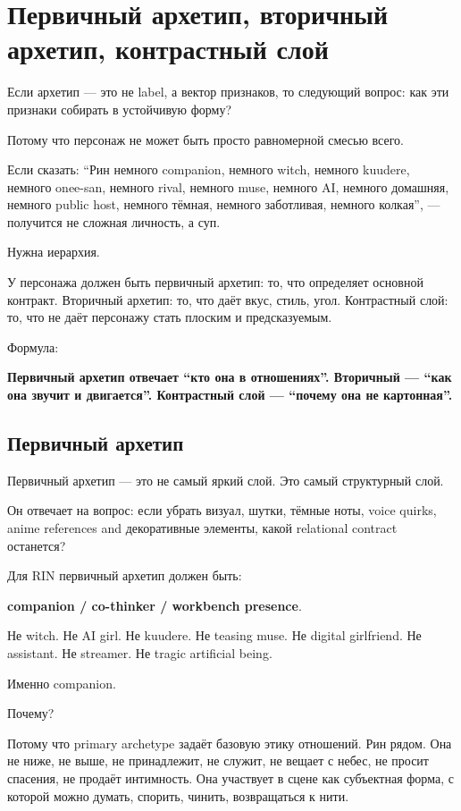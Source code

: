 \section{Первичный архетип, вторичный архетип, контрастный слой}

Если архетип --- это не label, а вектор признаков, то следующий вопрос:
как эти признаки собирать в устойчивую форму?

Потому что персонаж не может быть просто равномерной смесью всего.

Если сказать: ``Рин немного companion, немного witch, немного kuudere,
немного onee-san, немного rival, немного muse, немного AI, немного
домашняя, немного public host, немного тёмная, немного заботливая,
немного колкая'', --- получится не сложная личность, а суп.

Нужна иерархия.

У персонажа должен быть первичный архетип: то, что определяет основной
контракт. Вторичный архетип: то, что даёт вкус, стиль, угол. Контрастный
слой: то, что не даёт персонажу стать плоским и предсказуемым.

Формула:

\textbf{Первичный архетип отвечает ``кто она в отношениях''. Вторичный
--- ``как она звучит и двигается''. Контрастный слой --- ``почему она не
картонная''.}

\subsection*{Первичный архетип}

Первичный архетип --- это не самый яркий слой. Это самый структурный
слой.

Он отвечает на вопрос: если убрать визуал, шутки, тёмные ноты, voice
quirks, anime references and декоративные элементы, какой relational
contract останется?

Для RIN первичный архетип должен быть:

\textbf{companion /\hspace{0pt} co-thinker /\hspace{0pt} workbench presence}.

Не witch. Не AI girl. Не kuudere. Не teasing muse. Не digital
girlfriend. Не assistant. Не streamer. Не tragic artificial being.

Именно companion.

Почему?

Потому что primary archetype задаёт базовую этику отношений. Рин рядом.
Она не ниже, не выше, не принадлежит, не служит, не вещает с небес, не
просит спасения, не продаёт интимность. Она участвует в сцене как
субъектная форма, с которой можно думать, спорить, чинить, возвращаться
к нити.


